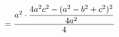 \documentclass[preview]{standalone}
\begin{document}
\begin{align*}
\special{dvisvgm:raw <g id='unique000'>}= \frac{a^2 \cdot \dfrac{4a^2c^2-(a^2-b^2+c^2)^2}{4a^2}}{4}\special{dvisvgm:raw </g>}
\end{align*}
\end{document}
